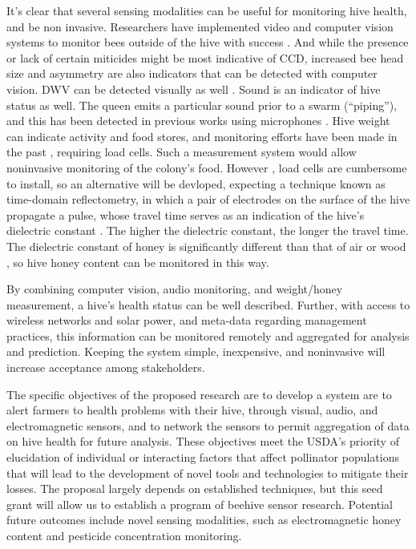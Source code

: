 It's clear that several sensing modalities can be useful for monitoring hive health, and be non invasive. Researchers have implemented video and computer vision systems to monitor bees outside of the hive with success \cite{azarcoya2014automatic,steen2011portable}. And while the presence or lack of certain miticides might be most indicative of CCD, increased bee head size and asymmetry are also indicators \cite{speybroeck2010weighing} that can be detected with computer vision. DWV can be detected visually as well \cite{de2010deformed}. Sound is an indicator of hive status as well. The queen emits a particular sound prior to a swarm (“piping”), and this has been detected in previous works using microphones \cite{ferrari2008monitoring, eren1997electronic}. Hive weight can indicate activity and food stores, and monitoring efforts have been made in the past \cite{meikle2008within}, requiring load cells. Such a measurement system would allow noninvasive monitoring of the colony's food. However , load cells are cumbersome to install, so an alternative will be devloped, expecting a technique known as time-domain reflectometry, in which a pair of electrodes on the surface of the hive propagate a pulse, whose travel time serves as an indication of the hive's dielectric constant \cite{dalton1984time}. The higher the dielectric constant, the longer the travel time. The dielectric constant of honey is significantly different than that of air or wood \cite{guo2010sugar}, so hive honey content can be monitored in this way.

By combining computer vision, audio monitoring, and weight/honey measurement,  a hive's health status can be well described. Further, with access to wireless networks and solar power, and meta-data regarding management practices, this information can be monitored remotely and aggregated for analysis and prediction. Keeping the system simple, inexpensive, and noninvasive will increase acceptance among stakeholders.

The specific objectives of the proposed research are to develop a system are to alert farmers to health problems with their hive, through visual, audio, and electromagnetic sensors, and to network the sensors to permit aggregation of data on hive health for future analysis. These objectives meet the USDA's priority of elucidation of individual or interacting factors that affect pollinator populations that will lead to the development of novel tools and technologies to mitigate their losses. The proposal largely depends on established techniques, but this seed grant will allow us to establish a program of beehive sensor research. Potential future outcomes include novel sensing modalities, such as electromagnetic honey content and pesticide concentration monitoring.

